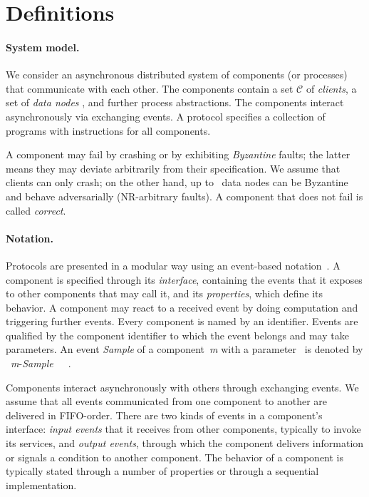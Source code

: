 \documentclass[oribibl]{llncs}
\theoremstyle{definition-boldhead}
\newcommand{\var}[1]{\textit{#1}}
\newcommand{\op}[1]{\textsl{#1}}
\newcommand{\eventt}[3]{~{\var{#1}}-\textsl{#2}~~{#3}~}
\newcommand{\clientset}{\ensuremath{\mathcal{C}}\xspace}
\newcommand{\nodes}{nodes\xspace}
\begin{document}
\section{Definitions}
\label{sec:def}

\paragraph{System model.}
We consider an asynchronous distributed system of components (or
processes) that communicate with each other.  The components contain a
set \clientset of  \emph{clients}, a set  of 
\emph{data \nodes} , and further process
abstractions.  The components interact asynchronously via exchanging
events.  A protocol specifies a collection of programs with
instructions for all components.


A component may fail by crashing or by exhibiting \emph{Byzantine}
faults; the latter means they may deviate arbitrarily from their
specification.  We assume that clients can only crash;
on the other hand, up to~ data \nodes can
be Byzantine and behave adversarially (NR-arbitrary faults).  A
component that does not fail is called \emph{correct}.





\paragraph{Notation.}
Protocols are presented in a modular way using an event-based
notation~\cite{CachinGR11}.  A component is specified through its
\emph{interface}, containing the events that it exposes to other
components that may call it, and its \emph{properties}, which define
its behavior.  A component may react to a received event by doing
computation and triggering further events.
Every component is named by an identifier.  Events are qualified by
the component identifier to which the event belongs and may take
parameters.  An event \op{Sample} of a component~\var{m} with a
parameter~ is denoted by \eventt{m}{Sample}{}.

\if\submit\no
Components interact asynchronously with others through exchanging
events.  We assume that all events communicated from one component to
another are delivered in FIFO-order.
There are two kinds of events in a component's interface: \emph{input
  events} that it receives from other components, typically to invoke
its services, and \emph{output events}, through which the component
delivers information or signals a condition to another component.  The
behavior of a component is typically stated through a number of
properties or through a sequential implementation.
\fi
\end{document}
